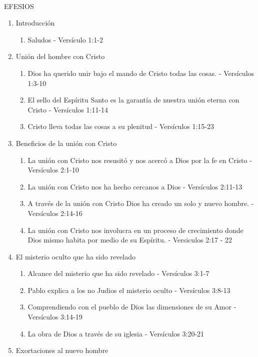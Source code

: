 \documentclass[9pt,letterpaper]{article}
\author{Ciencias}
\begin{document}
	\\
	{\large EFESIOS}\\
	
	\begin{enumerate}
		\item {\large Introducción}
		\begin{enumerate}
			\item Saludos  - Versículo 1:1-2
		\end{enumerate}
		\item  {\large Unión del hombre con Cristo}
		\begin{enumerate}
			\item Dios ha querido unir bajo el mando de Cristo todas las cosas. - Versículos 1:3-10
			\item El sello del Espíritu Santo es la garantía de nuestra unión eterna con Cristo - Versículos 1:11-14
			\item Cristo lleva todas las cosas a su plenitud - Versículos 1:15-23
		\end{enumerate}
		\item {\large Beneficios de la unión con Cristo}
		\begin{enumerate}
			\item La unión con Cristo nos resusitó y nos acercó a Dios por la fe en Cristo - Versículos 2:1-10
			\item La unión con Cristo nos ha hecho cercanos a Dios - Versículos 2:11-13
			\item A través de la unión con Cristo Dios ha creado un solo y nuevo hombre. - Versículos 2:14-16
			\item La unión con Cristo nos involucra en un proceso de crecimiento donde Dios mismo habita por medio de su Espíritu. - Versiculos 2:17 - 22
		\end{enumerate}
		\item {\large El misterio oculto que ha sido revelado}
		\begin{enumerate}
			\item Alcance del misterio que ha sido revelado - Versículos 3:1-7
			\item Pablo explica a los no Judios el misterio oculto - Versículos 3:8-13
			\item Comprendiendo con el pueblo de Dios las dimensiones de su Amor - Versículos 3:14-19
			\item La obra de Dios a través de su iglesia - Versículos 3:20-21
		\end{enumerate}
		\item {\large Exortaciones al nuevo hombre}

\end{enumerate}
\end{document}
